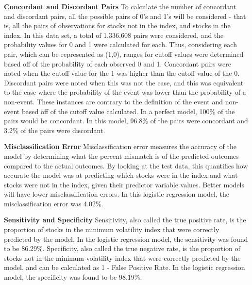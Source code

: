 \documentclass[12pt,twoside]{reedthesis}
\theoremstyle{definition}
\theoremstyle{definition}
\theoremstyle{definition}
\theoremstyle{remark}
\begin{document}
\hfill\break
\textbf{Concordant and Discordant Pairs} \hfill\break
To calculate the number of concordant and discordant pairs, all the
possible pairs of 0's and 1's will be considered - that is, all the
pairs of observations for stocks not in the index, and stocks in the
index. In this data set, a total of 1,336,608 pairs were considered, and
the probability values for 0 and 1 were calculated for each. Thus,
considering each pair, which can be represented as (1,0), ranges for
cutoff values were determined based off of the probability of each
observed 0 and 1. Concordant pairs were noted when the cutoff value for
the 1 was higher than the cutoff value of the 0. Discordant pairs were
noted when this was not the case, and this was equivalent to the case
where the probability of the event was lower than the probability of a
non-event. These instances are contrary to the definition of the event
and non-event based off of the cutoff value calculated. In a perfect
model, 100\% of the pairs would be concordant. In this model, 96.8\% of
the pairs were concordant and 3.2\% of the pairs were discordant.

\hfill\break
\textbf{Misclassification Error} \hfill\break
Misclassification error measures the accuracy of the model by
determining what the percent mismatch is of the predicted outcomes
compared to the actual outcomes. By looking at the test data, this
quantifies how accurate the model was at predicting which stocks were in
the index and what stocks were not in the index, given their predictor
variable values. Better models will have lower misclassification errors.
In this logistic regression model, the misclassification error was
4.02\%.

\hfill\break
\textbf{Sensitivity and Specificity} \hfill\break
Sensitivity, also called the true positive rate, is the proportion of
stocks in the minimum volatility index that were correctly predicted by
the model. In the logistic regression model, the sensitivity was found
to be 86.29\%. Specificity, also called the true negative rate, is the
proportion of stocks not in the minimum volatility index that were
correctly predicted by the model, and can be calculated as 1 - False
Positive Rate. In the logistic regression model, the specificity was
found to be 98.19\%.
\end{document}
